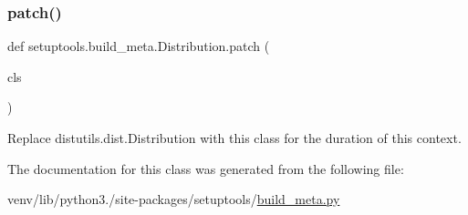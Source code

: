 \subsubsection{\texorpdfstring{patch()}{patch()}}
{\footnotesize\ttfamily def setuptools.\+build\+\_\+meta.\+Distribution.\+patch (\begin{DoxyParamCaption}\item[{}]{cls }\end{DoxyParamCaption})}

\begin{DoxyVerb}Replace
distutils.dist.Distribution with this class
for the duration of this context.
\end{DoxyVerb}
 

The documentation for this class was generated from the following file\+:\begin{DoxyCompactItemize}
\item 
venv/lib/python3./site-\/packages/setuptools/\hyperlink{build__meta_8py}{build\+\_\+meta.\+py}\end{DoxyCompactItemize}

